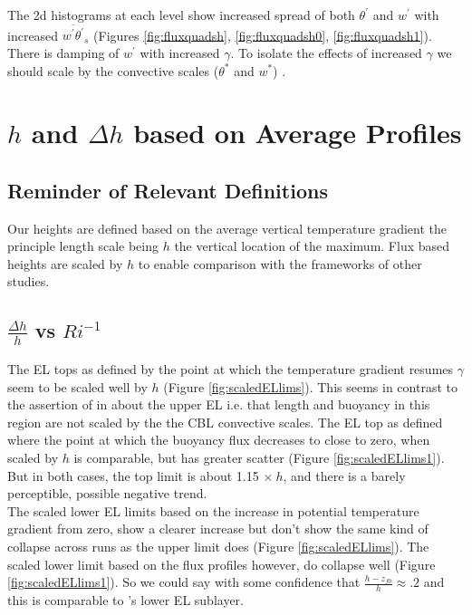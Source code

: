 The 2d histograms at each level show increased spread of both $\theta^{'}$ and $w^{'}$ with increased 
$\overline{w^{'}\theta^{'}}_{s}$ (Figures \ref{fig:fluxquadsh}, \ref{fig:fluxquadsh0}, \ref{fig:fluxquadsh1}).  There is damping of $w^{'}$ with increased $\gamma$.  To isolate the 
effects of increased $\gamma$ we should scale by the convective scales ($\theta^{*}$ and $w^{*}$) .


\section{$h$ and  $\Delta h$ based on Average Profiles}
\label{sec:hdeltahavprofs}
\subsection{Reminder of Relevant Definitions}
\FloatBarrier

Our heights are defined based on the average vertical temperature gradient the principle length scale being $h$ the vertical location of the maximum.  Flux based heights are scaled by $h$ to enable comparison with the frameworks of other studies.  

\subsection{$\frac{\Delta h}{h}$ vs $Ri^{-1}$}
\label{subsec:deltahri}
\FloatBarrier

The \acs{EL} tops as defined by the point at which the temperature gradient resumes $\gamma$ seem to be scaled well by $h$ (Figure \ref{fig:scaledELlims}).  This seems in contrast to the assertion of \citeauthor{GarciaMellado} in \cite{GarciaMellado} about the upper \acs{EL} i.e. that length and buoyancy in this region are not scaled by the the \acs{CBL} convective scales. The \acs{EL} top as defined where the point at which the buoyancy flux decreases to close to zero, when scaled by $h$ is comparable, but has greater scatter (Figure \ref{fig:scaledELlims1}). But in both cases, the top limit is about 1.15 $\times \ h$, and there is a barely perceptible, possible negative trend.\\  

The scaled lower \acs{EL} limits based on the increase in potential temperature gradient from zero, show a clearer increase but don't show the same kind of collapse across runs as the upper limit does (Figure \ref{fig:scaledELlims}).  The scaled lower limit based on the flux profiles however, do collapse well (Figure \ref{fig:scaledELlims1}).  So we could say with some confidence that $\frac{h-z_{f0}}{h} \approx .2$ and this is comparable to \citeauthor{GarciaMellado}'s lower \acs{EL} sublayer.\\
  
